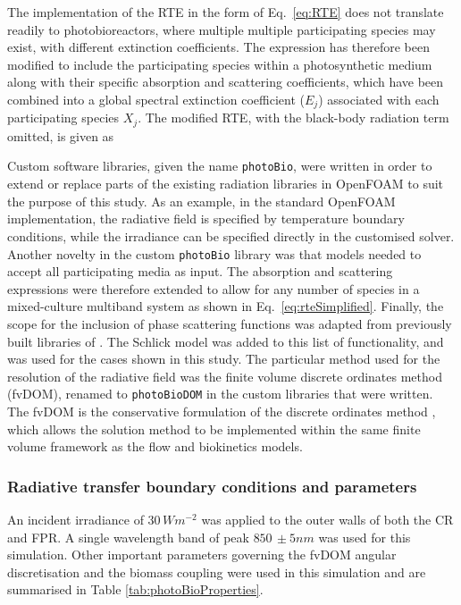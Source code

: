 The implementation of the RTE in the form of Eq.\ \ref{eq:RTE} does not translate readily to photobioreactors, where multiple multiple participating species may exist, with different extinction coefficients. The expression has therefore been modified to include the participating species within a photosynthetic medium along with their specific absorption and scattering coefficients, which have been combined into a global spectral extinction coefficient ($E_j$) associated with each participating species $X_j$. The modified RTE, with the black-body radiation term omitted, is given as



Custom software libraries, given the name \texttt{photoBio}, were written in order to extend or replace parts of the existing radiation libraries in OpenFOAM to suit the purpose of this study. As an example, in the standard OpenFOAM implementation, the radiative field is specified by temperature boundary conditions, while the irradiance can be specified directly in the customised solver.  Another novelty in the custom \texttt{photoBio} library was that models needed to accept all participating media as input. The absorption and scattering expressions were therefore extended to allow for any number of species in a mixed-culture multiband system as shown in Eq.\ \ref{eq:rteSimplified}. Finally, the scope for the inclusion of phase scattering functions was adapted from previously built libraries of \cite{kong2014}. The Schlick model was added to this list of functionality, and was used for the cases shown in this study.
\skippingparagraph
The particular method used for the resolution of the radiative field was the finite volume discrete ordinates method (fvDOM), renamed to \texttt{photoBioDOM} in the custom libraries that were written. The fvDOM is the conservative formulation of the discrete ordinates method \cite{raithby1990}, which allows the solution method to be implemented within the same finite volume framework as the flow and biokinetics models.


\subsubsection{Radiative transfer boundary conditions and parameters}

An incident irradiance of $30\, Wm^{-2}$ was applied to the outer walls of both the CR and FPR. A single wavelength band of peak $850\, \pm 5 nm$ was used for this simulation. Other important parameters governing the fvDOM angular discretisation and the biomass coupling were used in this simulation and are summarised in Table \ref{tab:photoBioProperties}.


